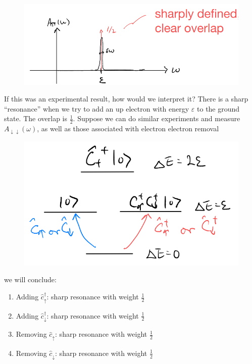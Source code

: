 \begin{figure}[ht]
    \centering
    \includegraphics[width=\textwidth]{jupyterbook/data/fig/lec05-fig04.png}
\end{figure}

If this was an experimental result, how would we interpret it? There is a sharp ``resonance'' when we try to add an up electron with energy $\varepsilon$ to the ground state. The overlap is $\frac{1}{2}$. Suppose we can do similar experiments and measure $A_{\downarrow\downarrow}(\omega)$, as well as those associated with electron electron removal

\begin{figure}[ht]
    \centering
    \includegraphics[width=\textwidth]{jupyterbook/data/fig/lec05-fig05.png}
\end{figure}

we will conclude:
\begin{enumerate}
    \item Adding $\hat{c}_{\uparrow}^{\dagger}$: sharp resonance with weight $\frac{1}{2}$
    \item Adding $\hat{c}_{\downarrow}^{\dagger}$: sharp resonance with weight $\frac{1}{2}$
    \item Removing $\hat{c}_{\uparrow}$: sharp resonance with weight $\frac{1}{2}$
    \item Removing $\hat{c}_{\downarrow}$: sharp resonance with weight $\frac{1}{2}$
\end{enumerate}

